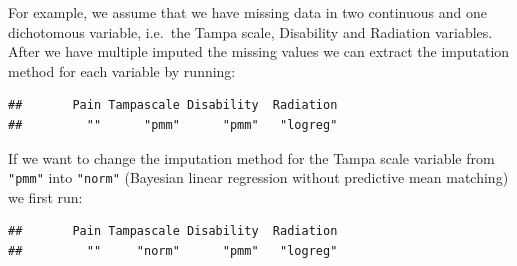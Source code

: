 \documentclass[
]{book}
\newenvironment{Shaded}{\begin{snugshade}}{\end{snugshade}}
\newcommand{\AttributeTok}[1]{\textcolor[rgb]{0.77,0.63,0.00}{#1}}
\newcommand{\CommentTok}[1]{\textcolor[rgb]{0.56,0.35,0.01}{\textit{#1}}}
\newcommand{\ConstantTok}[1]{\textcolor[rgb]{0.00,0.00,0.00}{#1}}
\newcommand{\DecValTok}[1]{\textcolor[rgb]{0.00,0.00,0.81}{#1}}
\newcommand{\FunctionTok}[1]{\textcolor[rgb]{0.00,0.00,0.00}{#1}}
\newcommand{\NormalTok}[1]{#1}
\newcommand{\OtherTok}[1]{\textcolor[rgb]{0.56,0.35,0.01}{#1}}
\newcommand{\SpecialCharTok}[1]{\textcolor[rgb]{0.00,0.00,0.00}{#1}}
\newcommand{\StringTok}[1]{\textcolor[rgb]{0.31,0.60,0.02}{#1}}
\begin{document}
For example, we assume that we have missing data in two continuous and one dichotomous variable, i.e.~the Tampa scale, Disability and Radiation variables. After we have multiple imputed the missing values we can extract the imputation method for each variable by running:

\begin{Shaded}
\end{Shaded}

\begin{verbatim}
##       Pain Tampascale Disability  Radiation 
##         ""      "pmm"      "pmm"   "logreg"
\end{verbatim}

If we want to change the imputation method for the Tampa scale variable from \texttt{"pmm"} into \texttt{"norm"} (Bayesian linear regression without predictive mean matching) we first run:

\begin{Shaded}
\end{Shaded}

\begin{verbatim}
##       Pain Tampascale Disability  Radiation 
##         ""     "norm"      "pmm"   "logreg"
\end{verbatim}
\end{document}
